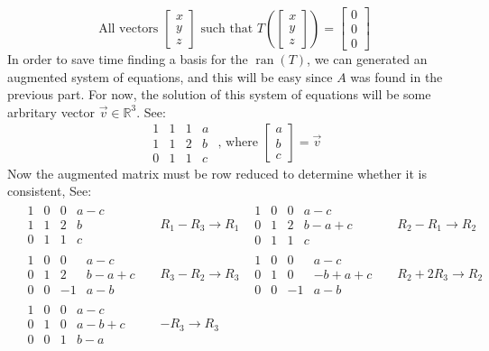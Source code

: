 \documentclass{report}
\begin{document}
$$
\text{All vectors } \begin{bmatrix} x \\ y \\ z \end{bmatrix} 
\text{ such that } T\left(\begin{bmatrix} x \\ y \\ z \end{bmatrix}\right) = \begin{bmatrix} 0 \\ 0 \\ 0 \end{bmatrix}
$$ 
In order to save time finding a basis for the $\operatorname{ran}(T)$,  we can generated an augmented system of equations,  and this will be easy since $A$ was found in the previous part.  For now, the solution of this system of equations will be some arbritary vector $\vec{v}\in\mathbb{R}^3$.  See:
$$
\begin{array}{ccc|c}
1 & 1 & 1 & a \\
1 & 1 & 2 & b \\
0 & 1 & 1 & c
\end{array}
\text{ ,  where }
\begin{bmatrix}
a \\ b \\ c
\end{bmatrix} = \vec{v}
$$
Now the augmented matrix must be row reduced to determine whether it is consistent,  See:
\begin{align*}
	&\begin{array}{ccc|c}
		1 & 0 & 0 & a - c \\
		1 & 1 & 2 & b \\
		0 & 1 & 1 & c
	\end{array}
	&& R_1 - R_3 \rightarrow R_1
	&\begin{array}{ccc|c}
		1 & 0 & 0 & a - c \\
		0 & 1 & 2 & b - a + c \\
		0 & 1 & 1 & c
	\end{array}
	&& R_2 - R_1 \rightarrow R_2 \\
	&\begin{array}{ccc|c}
		1 & 0 & 0 & a - c \\
		0 & 1 & 2 & b - a + c \\
		0 & 0 & -1 & a - b
	\end{array}
	&& R_3 - R_2 \rightarrow R_3
	&\begin{array}{ccc|c}
		1 & 0 & 0 & a - c \\
		0 & 1 & 0 & -b + a + c \\
		0 & 0  & -1 & a - b
	\end{array}
	&& R_2 + 2R_3 \rightarrow R_2 \\
	&\begin{array}{ccc|c}
		1 & 0 & 0 & a - c \\
		0 & 1 & 0 & a - b + c \\
		0 & 0 & 1 & b - a
	\end{array}
	&&-R_3 \rightarrow R_3
\end{align*}
\end{document}
